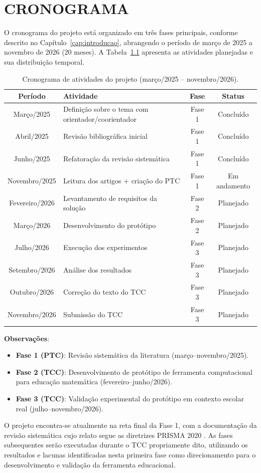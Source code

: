 \chapter{CRONOGRAMA}
\label{cap:cronograma}

O cronograma do projeto está organizado em três fases principais, conforme descrito 
no Capítulo~\ref{cap:introducao}, abrangendo o período de março de 2025 a novembro 
de 2026 (20 meses). A Tabela~\ref{tab:cronograma} apresenta as atividades planejadas 
e sua distribuição temporal.

\begin{table}[htbp]
\centering
\caption{Cronograma de atividades do projeto (março/2025 -- novembro/2026).}
\label{tab:cronograma}
\small
\begin{tabular}{clcc}
\hline
\textbf{Período} & \textbf{Atividade} & \textbf{Fase} & \textbf{Status} \\
\hline
Março/2025 & Definição sobre o tema com orientador/coorientador & Fase 1 & Concluído \\
Abril/2025 & Revisão bibliográfica inicial & Fase 1 & Concluído \\
Junho/2025 & Refatoração da revisão sistemática & Fase 1 & Concluído \\
Novembro/2025 & Leitura dos artigos + criação do PTC & Fase 1 & Em andamento \\
\hline
Fevereiro/2026 & Levantamento de requisitos da solução & Fase 2 & Planejado \\
Março/2026 & Desenvolvimento do protótipo & Fase 2 & Planejado \\
\hline
Julho/2026 & Execução dos experimentos & Fase 3 & Planejado \\
Setembro/2026 & Análise dos resultados & Fase 3 & Planejado \\
Outubro/2026 & Correção do texto do TCC & Fase 3 & Planejado \\
Novembro/2026 & Submissão do TCC & Fase 3 & Planejado \\
\hline
\end{tabular}
\end{table}

\textbf{Observações}:

\begin{itemize}
    \item \textbf{Fase 1 (PTC)}: Revisão sistemática da literatura (março--novembro/2025).
    \item \textbf{Fase 2 (TCC)}: Desenvolvimento de protótipo de ferramenta computacional 
    para educação matemática (fevereiro--junho/2026).
    \item \textbf{Fase 3 (TCC)}: Validação experimental do protótipo em contexto 
    escolar real (julho--novembro/2026).
\end{itemize}

O projeto encontra-se atualmente na reta final da Fase 1, com a documentação da 
revisão sistemática cujo relato segue as diretrizes PRISMA 2020 \cite{PRISMA2020}. 
As fases subsequentes serão executadas durante o TCC propriamente dito, utilizando 
os resultados e lacunas identificadas nesta primeira fase como direcionamento para 
o desenvolvimento e validação da ferramenta educacional.